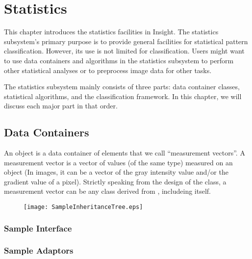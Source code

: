 \chapter{Statistics}
\label{sec:StaisticsFramework}

This chapter introduces the statistics facilities in Insight. The
statistics subsystem's primary purpose is to provide general facilities
for statistical pattern classification. However, its use is not limited
for classification. Users might want to use data containers and
algorithms in the statistics subsystem to perform other statistical
analyses or to preprocess image data for other tasks.

The statistics subsystem mainly consists of three parts: data container
classes, statistical algorithms, and the classification framework. In this
chapter, we will discuss each major part in that order.

\section{Data Containers}
\label{sec:StatisticsDataContainer}

An  object is a data container of
elements that we call ``measurement vectors''. A measurement vector is a
vector of values (of the same type) measured on an object (In images, it
can be a vector of the gray intensity value and/or the gradient value of
a pixel). Strictly speaking from the design of the
 class, a measurement vector can be any
class derived from , includeing 
itself.

\begin{figure}
  \centering
  \texttt{[image: SampleInheritanceTree.eps]}
  \protect\label{fig:SampleInheritanceTree}
\end{figure}

\subsection{Sample Interface}
\label{sec:SampleInterface}



\subsection{Sample Adaptors}
\label{sec:SampleAdaptors}

